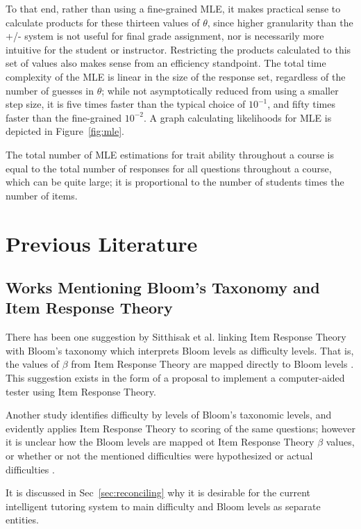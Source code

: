To that end, rather than using a fine-grained MLE, it makes practical sense to
calculate products for these thirteen values of $\theta$, since higher
granularity than the +/- system is not useful for final grade assignment, nor
is necessarily more intuitive for the student or instructor.  Restricting the
products calculated to this set of values also makes sense from an efficiency
standpoint.  The total time complexity of the MLE is linear in the size of the
response set, regardless of the number of guesses in $\theta$; while not
asymptotically reduced from using a smaller step size, it is five times faster
than the typical choice of $10^{-1}$, and fifty times faster than the
fine-grained $10^{-2}$.  A graph calculating likelihoods for MLE is depicted in
Figure~\ref{fig:mle}.


The total number of MLE estimations for trait ability throughout a course is
equal to the total number of responses for all questions throughout a course,
which can be quite large; it is proportional to the number of students times
the number of items. 


\section{Previous Literature}

\subsection{Works Mentioning Bloom's Taxonomy and Item Response Theory}

There has been one suggestion by Sitthisak et al.  linking Item Response Theory
with Bloom's taxonomy which interprets Bloom levels as difficulty levels.  That
is, the values of $\beta$ from Item Response Theory are mapped directly to
Bloom levels \cite{sitthisak}.  This suggestion exists in the form of a
proposal to implement a computer-aided tester using Item Response Theory.

Another study identifies difficulty by levels of Bloom's taxonomic levels, and
evidently applies Item Response Theory to scoring of the same questions;
however it is unclear how the Bloom levels are mapped ot Item Response Theory
$\beta$ values, or whether or not the mentioned difficulties were hypothesized
or actual difficulties \cite{osborne2013grounded}.  

It is discussed in Sec~\ref{sec:reconciling} why it is desirable for the
current intelligent tutoring system to main difficulty and Bloom levels as
separate entities.


